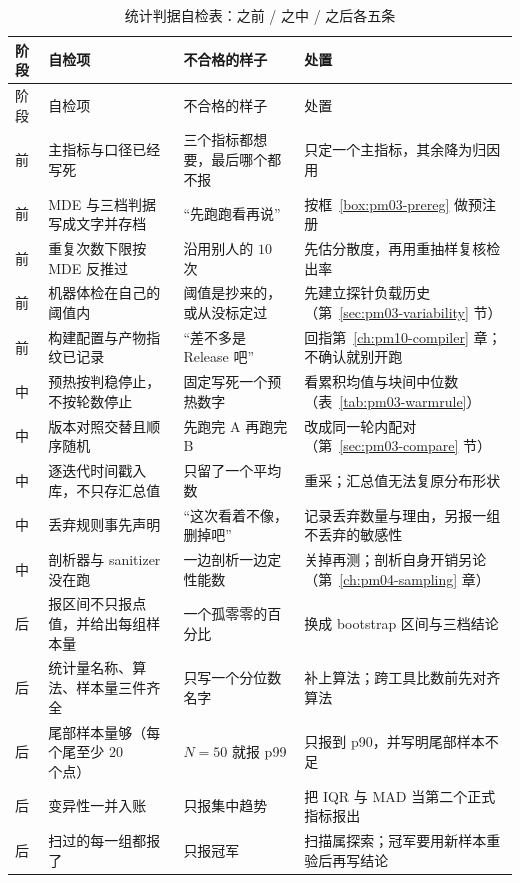 \documentclass[12pt,a4paper,fontset=fandol]{ctexbook}
\newcommand{\Mx}[1]{\textsf{#1}}
\begin{document}
\begin{longtable}{>{\raggedright\arraybackslash}p{} >{\raggedright\arraybackslash}p{} >{\raggedright\arraybackslash}p{} >{\raggedright\arraybackslash}p{}}
\caption{统计判据自检表：之前 / 之中 / 之后各五条}\label{tab:pm03-checklist}\\
\toprule
阶段 & 自检项 & 不合格的样子 & 处置 \\
\midrule
\endfirsthead
\toprule
阶段 & 自检项 & 不合格的样子 & 处置 \\
\midrule
\endhead
\bottomrule
\endfoot
\endlastfoot
前 & 主指标与口径已经写死 & 三个指标都想要，最后哪个都不报 & 只定一个主指标，其余降为归因用 \\
前 & \Mx{MDE} 与三档判据写成文字并存档 & ``先跑跑看再说'' & 按框~\ref{box:pm03-prereg} 做预注册 \\
前 & 重复次数下限按 \Mx{MDE} 反推过 & 沿用别人的 $10$ 次 & 先估分散度，再用重抽样复核检出率 \\
前 & 机器体检在自己的阈值内 & 阈值是抄来的，或从没标定过 & 先建立探针负载历史（第~\ref{sec:pm03-variability} 节） \\
前 & 构建配置与产物指纹已记录 & ``差不多是 Release 吧'' & 回指第~\ref{ch:pm10-compiler} 章；不确认就别开跑 \\
中 & 预热按判稳停止，不按轮数停止 & 固定写死一个预热数字 & 看累积均值与块间中位数（表~\ref{tab:pm03-warmrule}） \\
中 & 版本对照交替且顺序随机 & 先跑完 A 再跑完 B & 改成同一轮内配对（第~\ref{sec:pm03-compare} 节） \\
中 & 逐迭代时间戳入库，不只存汇总值 & 只留了一个平均数 & 重采；汇总值无法复原分布形状 \\
中 & 丢弃规则事先声明 & ``这次看着不像，删掉吧'' & 记录丢弃数量与理由，另报一组不丢弃的敏感性 \\
中 & 剖析器与 sanitizer 没在跑 & 一边剖析一边定性能数 & 关掉再测；剖析自身开销另论（第~\ref{ch:pm04-sampling} 章） \\
后 & 报区间不只报点值，并给出每组样本量 & 一个孤零零的百分比 & 换成 bootstrap 区间与三档结论 \\
后 & 统计量名称、算法、样本量三件齐全 & 只写一个分位数名字 & 补上算法；跨工具比数前先对齐算法 \\
后 & 尾部样本量够（每个尾至少 $20$ 个点） & $N=50$ 就报 \Mx{p99} & 只报到 \Mx{p90}，并写明尾部样本不足 \\
后 & 变异性一并入账 & 只报集中趋势 & 把 \Mx{IQR} 与 \Mx{MAD} 当第二个正式指标报出 \\
后 & 扫过的每一组都报了 & 只报冠军 & 扫描属探索；冠军要用新样本重验后再写结论 \\
\end{longtable}
\end{document}
